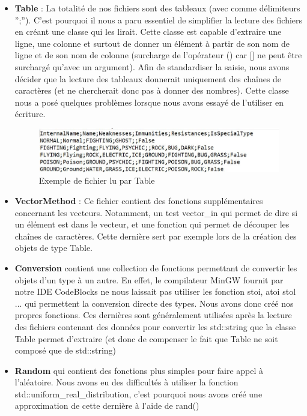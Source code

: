 \documentclass[a4paper,twoside, openany,11pt]{book}
\begin{document}
\begin{itemize}
\item \textbf{Table }: La totalité de nos fichiers sont des tableaux (avec comme délimiteurs '';''). C'est pourquoi il nous a paru essentiel de simplifier la lecture des fichiers en créant une classe qui les lirait. Cette classe est capable d'extraire une ligne, une colonne et surtout de donner un élément à partir de son nom de ligne et de son nom de colonne (surcharge de l'opérateur () car [] ne peut être surchargé qu'avec un argument). Afin de standardiser la saisie, nous avons décider que la lecture des tableaux donnerait uniquement des chaînes de caractères (et ne chercherait donc pas à donner des nombres). Cette classe nous a posé quelques problèmes lorsque nous avons essayé de l'utiliser en écriture.

\begin{figure}[!h]\centering
\includegraphics[scale = 0.84]{Images/fichierTexteExemple.jpg}
\caption{Exemple de fichier lu par Table}
\end{figure}

\item \textbf{VectorMethod} : Ce fichier contient des fonctions supplémentaires concernant les vecteurs. Notamment, un test vector\_in qui permet de dire si un élément est dans le vecteur, et une fonction qui permet de découper les chaînes de caractères. Cette dernière sert par exemple lors de la création des objets de type Table. 
\item \textbf{Conversion} contient une collection de fonctions permettant de convertir les objets d'un type à un autre. En effet, le compilateur MinGW fournit par notre IDE CodeBlocks ne nous laissait pas utiliser les fonction stoi, atoi stol ... qui permettent la conversion directe des types. Nous avons donc créé nos propres fonctions. Ces dernières sont généralement utilisées après la lecture des fichiers contenant des données pour convertir les std::string que la classe Table permet d'extraire (et donc de compenser le fait que Table ne soit composé que de std::string)

\item \textbf{Random} qui contient des fonctions plus simples pour faire appel à l'aléatoire. Nous avons eu des difficultés à utiliser la fonction std::uniform\_real\_distribution, c'est pourquoi nous avons créé une approximation de cette dernière à l'aide de rand()


\end{itemize}
\end{document}
